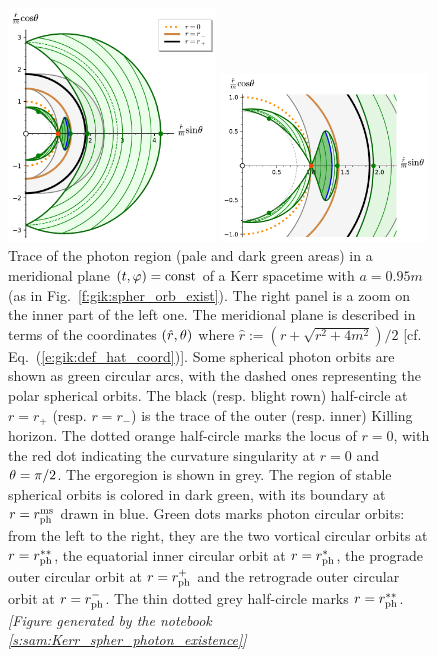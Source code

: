 \begin{figure}
\parbox[c]{0.49\textwidth}{\includegraphics[width=0.49\textwidth]{gik_spo_meridional.pdf}}
\parbox[c]{0.49\textwidth}{\includegraphics[width=0.49\textwidth]{gik_spo_meridional_zoom.pdf}}
\caption[]{\label{f:gik:spo_meridional} \footnotesize
Trace of the photon region (pale and dark green areas) in
a meridional plane $(t,\varphi)=\mathrm{const}$ of
a Kerr spacetime with $a = 0.95 m$ (as in Fig.~\ref{f:gik:spher_orb_exist}).
The right panel is a zoom on the inner part of the left one.
The meridional plane is described in terms of the coordinates $(\hat{r},\theta)$
where $\hat{r} := (r + \sqrt{r^2 + 4m^2})/2$ [cf. Eq.~(\ref{e:gik:def_hat_coord})].
Some spherical photon orbits are shown as green circular arcs,
with the dashed ones representing the polar spherical orbits.
The black (resp. blight rown) half-circle at $r=r_+$ (resp. $r=r_-$)
is the trace of the outer (resp. inner) Killing horizon.
The dotted orange half-circle marks the locus of $r=0$, with the
red dot indicating the curvature singularity at $r=0$ and $\theta=\pi/2$.
The ergoregion is shown in grey. The region of stable spherical orbits is
colored in dark green, with its boundary at $r=r_{\rm ph}^{\rm ms}$ drawn in blue.
Green dots marks photon circular orbits: from the left to the right, they
are the two vortical circular orbits at $r=r_{\rm ph}^{**}$, the equatorial
inner circular orbit at $r=r_{\rm ph}^*$, the prograde outer circular orbit
at $r=r_{\rm ph}^+$ and the retrograde outer circular orbit at $r=r_{\rm ph}^-$.
The thin dotted grey half-circle marks $r=r_{\rm ph}^{**}$.
\textsl{[Figure generated by the notebook \ref{s:sam:Kerr_spher_photon_existence}]}
}
\end{figure}


